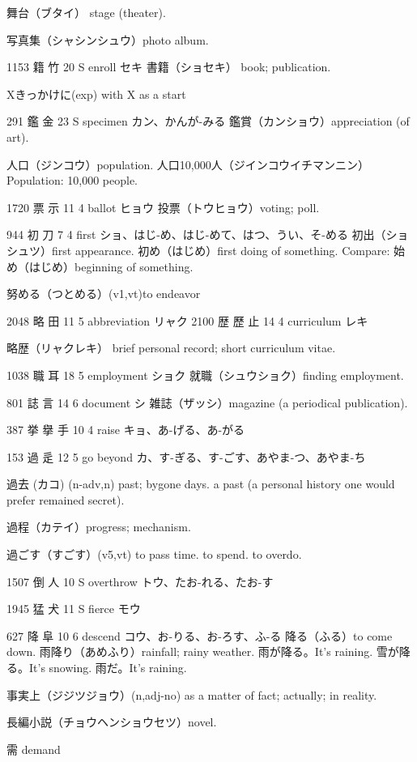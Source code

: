 舞台（ブタイ）
stage (theater).

写真集（シャシンシュウ）photo album.

1153	籍		竹	20	S		enroll	セキ
書籍（ショセキ）
book; publication.

Xきっかけに(exp) with X as a start

291	鑑		金	23	S		specimen	カン、かんが-みる
鑑賞（カンショウ）appreciation (of art).

人口（ジンコウ）population.
人口10,000人（ジインコウイチマンニン）
Population: 10,000 people.

1720	票		示	11	4		ballot	ヒョウ
投票（トウヒョウ）voting; poll.

944	初		刀	7	4		first	ショ、はじ-め、はじ-めて、はつ、うい、そ-める
初出（ショシュツ）first appearance.
初め（はじめ）first doing of something.
Compare: 始め（はじめ）beginning of something.

努める（つとめる）(v1,vt)to endeavor

2048	略		田	11	5		abbreviation	リャク
2100	歴	歷	止	14	4		curriculum	レキ

略歴（リャクレキ）
brief personal record;
short curriculum vitae.

1038	職		耳	18	5		employment	ショク
就職（シュウショク）finding employment.

801	誌		言	14	6		document	シ
雑誌（ザッシ）magazine (a periodical publication).

387	挙	擧	手	10	4		raise	キョ、あ-げる、あ-がる

153	過		辵	12	5		go beyond	カ、す-ぎる、す-ごす、あやま-つ、あやま-ち

過去 (カコ) (n-adv,n)
past; bygone days.
a past (a personal history one would prefer remained secret).

過程（カテイ）progress; mechanism.

過ごす（すごす）(v5,vt) to pass time. to spend. to overdo.

1507	倒		人	10	S		overthrow	トウ、たお-れる、たお-す

1945	猛		犬	11	S		fierce	モウ

627	降		阜	10	6		descend	コウ、お-りる、お-ろす、ふ-る
降る（ふる）to come down.
雨降り（あめふり）rainfall; rainy weather.
雨が降る。It's raining.
雪が降る。It's snowing.
雨だ。It's raining.

事実上（ジジツジョウ）(n,adj-no)
as a matter of fact; actually; in reality.

長編小説（チョウヘンショウセツ）novel.

需 demand


